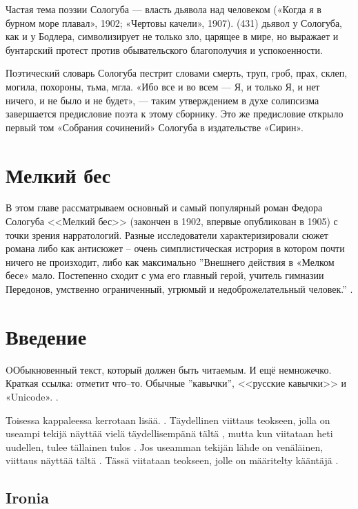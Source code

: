 \documentclass[12pt,a4paper]{article}
\begin{document}
Частая тема поэзии Сологуба — власть дьявола над человеком («Когда я в бурном море плавал», 1902; «Чертовы качели», 1907). (431)
дьявол у Сологуба, как и у Бодлера, символизирует не только зло, царящее в мире, но выражает и бунтарский протест против обывательского благополучия и успокоенности.

 Поэтический словарь Сологуба пестрит словами смерть, труп, гроб, прах, склеп, могила, похороны, тьма, мгла.
 «Ибо все и во всем — Я, и только Я, и нет ничего, и не было и не будет», — таким утверждением в духе солипсизма завершается предисловие поэта к этому сборнику. Это же предисловие открыло первый том «Собрания сочинений» Сологуба в издательстве «Сирин».




\section{Мелкий бес}

В этом главе рассматрываем основный и самый популярный роман Федора Сологуба <<Мелкий бес>> (закончен в 1902, впервые опубликован в 1905) с точки зрения нарратологий. Разные исследователи характеризировали сюжет романа либо как антисюжет -- очень симплистическая истрория в котором почти ничего не произходит, либо как максимально  
''Внешнего действия в «Мелком бесе» мало. Постепенно сходит с ума его главный герой, учитель гимназии Передонов, умственно ограниченный, угрюмый и недоброжелательный человек.''
\parencite[432]{grigorjev1983}.

\section{Введение}

OОбыкновенный текст, который должен быть читаемым. И ещё немножечко. Краткая ссылка: \textcite[150--152]{kobrinski2013} отметит что–то. Обычные ''кавычки'', <<русские кавычки>> и «Unicode». \parencite[200]{kobrinski2013}.

Toisessa kappaleessa kerrotaan lisää. \parencite{shapir2007}. Täydellinen viittaus teokseen,
jolla on useampi tekijä näyttää vielä täydellisempänä
tältä \parencite[][268]{SKS2007}, mutta kun viitataan heti uudellen, tulee tällainen tulos
\parencite[50]{SKS2007}. Jos useamman tekijän lähde on venäläinen, viittaus näyttää tältä
\parencite{ljustrova1976}. Tässä viitataan teokseen, jolle on määritelty kääntäjä
\parencite[25]{ref:sologub1918}.

\subsection{Ironia}
\end{document}
